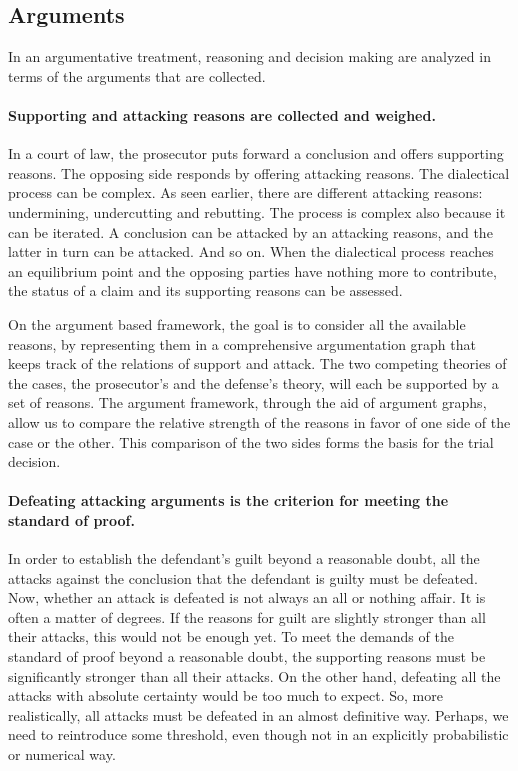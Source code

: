 \documentclass[10pt]{article}
\begin{document}
\subsection{Arguments}

In an argumentative treatment, reasoning and decision making are analyzed in terms of the arguments that are collected.

\paragraph{Supporting and attacking reasons are collected and weighed.}

In a court of law, the prosecutor puts forward a conclusion and offers supporting reasons. The opposing side responds by offering attacking reasons. 
The dialectical process can be complex. As seen earlier, there are different attacking reasons: undermining, undercutting and rebutting. The process is complex also because 
it can be iterated. A conclusion can be attacked by an attacking reasons, and the latter in turn can be attacked. And so on. 
When the dialectical process reaches an equilibrium point and the opposing parties have nothing more to contribute, 
the status of a claim and its supporting reasons can be assessed. 

On the argument based framework, the goal is to consider all the available reasons, by representing them in a comprehensive argumentation graph that 
keeps track of the relations of support and attack. The two competing theories of the cases, the prosecutor's and the defense's theory, will each
be supported by a set of reasons. The argument framework, through the aid of argument graphs, allow us to 
compare the relative strength of the reasons in favor of one side of the case or the other. This comparison of the two sides 
forms the basis for the trial decision.


\paragraph{Defeating attacking arguments is the criterion for meeting the standard of proof.}

In order to establish the defendant's guilt beyond a reasonable doubt, 
all the attacks against the conclusion that the defendant is guilty must be 
defeated. Now, whether an attack is defeated 
is not always an all or nothing affair. It is often a matter of degrees. 
If the reasons for guilt are slightly stronger than all their attacks, this would not be enough yet. 
To meet the demands of the standard of proof beyond a reasonable doubt, the supporting reasons must be significantly 
stronger than all their attacks. On the other hand, defeating all the attacks with absolute certainty would be too much to expect. 
So, more realistically, all attacks must be defeated in an almost definitive way. Perhaps, we need 
to reintroduce some threshold, even though not in an explicitly probabilistic or numerical way. 
\end{document}

